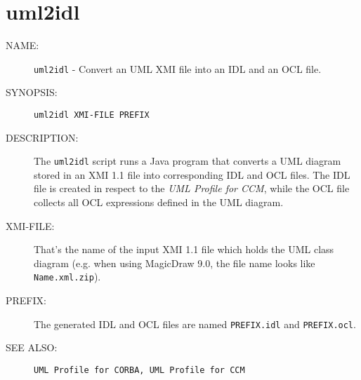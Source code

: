 \section{uml2idl}

\begin{description}

\item [NAME:] 
  {\tt uml2idl} - Convert an UML XMI file into an IDL and an OCL file. 

\item [SYNOPSIS:] 
  {\tt uml2idl XMI-FILE PREFIX}

\item [DESCRIPTION:]
  The {\tt uml2idl} script runs a Java program that converts a UML diagram stored
  in an XMI 1.1 file into corresponding IDL and OCL files.
  The IDL file is created in respect to the {\it UML Profile for CCM}, while the
  OCL file collects all OCL expressions defined in the UML diagram.

\item [XMI-FILE:]
  That's the name of the input XMI 1.1 file which holds the UML class diagram
  (e.g. when using MagicDraw 9.0, the file name looks like {\tt Name.xml.zip}).

\item [PREFIX:]
  The generated IDL and OCL files are named {\tt PREFIX.idl} and {\tt PREFIX.ocl}.

\item [SEE ALSO:]
  {\tt UML Profile for CORBA, UML Profile for CCM}
  
\end{description}
